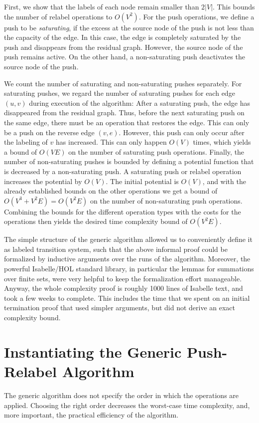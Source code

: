 \documentclass[smallcondensed]{svjour3}     %
\begin{document}
First, we show that the labels of each node remain smaller than $2|V|$. This bounds the number of relabel operations to $O(V^2)$.
For the push operations, we define a push to be \emph{saturating}, if the excess at the source node of the push is not less than the capacity of the edge.
In this case, the edge is completely saturated by the push and disappears from the residual graph. However, the source node of the push remains active.
On the other hand, a non-saturating push deactivates the source node of the push.

We count the number of saturating and non-saturating pushes separately. For saturating pushes, we regard the number of saturating pushes for each edge $(u,v)$ during execution of the algorithm: After a saturating push, the edge has disappeared from the residual graph. Thus, before the next saturating push on the same edge, 
there must be an operation that restores the edge. This can only be a push on the reverse edge $(v,e)$. 
However, this push can only occur after the labeling of $v$ has increased. This can only happen $O(V)$ times, which yields a bound of $O(VE)$ on the number 
of saturating push operations. 
Finally, the number of non-saturating pushes is bounded by defining a potential function that is decreased by a non-saturating push.
A saturating push or relabel operation increases the potential by $O(V)$.
The initial potential is $O(V)$, and with the already established bounds on the other operations we get a bound of
$O(V^3 + V^2E) = O(V^2E)$ on the number of non-saturating push operations. Combining the bounds for the different operation types with the costs for the operations 
then yields the desired time complexity bound of $O(V^2E)$.

The simple structure of the generic algorithm allowed us to conveniently define it as labeled transition system, such that the above informal proof could be formalized
by inductive arguments over the runs of the algorithm.
Moreover, the powerful Isabelle/HOL standard library, in particular the lemmas for summations
over finite sets, were very helpful to keep the formalization effort manageable. 
Anyway, the whole complexity proof is roughly 1000 lines of Isabelle text, and took a few weeks to complete.
This includes the time that we spent on an initial termination proof that used simpler arguments, but did not derive an exact complexity bound.

\section{Instantiating the Generic Push-Relabel Algorithm}\label{sec:prpu-inst}
The generic algorithm does not specify the order in which the operations are applied. 
Choosing the right order decreases the worst-case time complexity, and, more important, the practical efficiency of the algorithm.
\end{document}

